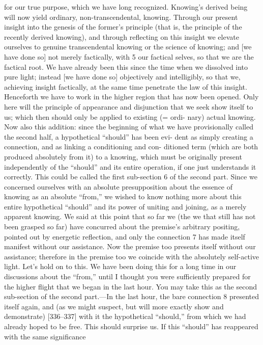 for our true purpose, which we have long recognized. Knowing’s derived being
will now yield ordinary, non-transcendental, knowing. Through our present
insight into the genesis of the former’s principle (that is, the principle of the
recently derived knowing), and through reflecting on this insight we elevate
ourselves to genuine transcendental knowing or the science of knowing; and
[we have done so] not merely factically, with 5 our factical selves, so that we are
the factical root. We have already been this since the time when we dissolved
into pure light; instead [we have done so] objectively and intelligibly, so that
we, achieving insight factically, at the same time penetrate the law of this
insight. Henceforth we have to work in the higher region that has now been
opened. Only here will the principle of appearance and disjunction that we
seek show itself to us; which then should only be applied to existing (= ordi-
nary) actual knowing. Now also this addition: since the beginning of what we
have provisionally called the second half, a hypothetical “should” has been evi-
dent as simply creating a connection, and as linking a conditioning and con-
ditioned term (which are both produced absolutely from it) to a knowing,
which must be originally present independently of the “should” and its entire
operation, if one just understands it correctly. This could be called the first
sub-section 6 of the second part. Since we concerned ourselves with an absolute
presupposition about the essence of knowing as an absolute “from,” we wished
to know nothing more about this entire hypothetical “should” and its power
of uniting and joining, as a merely apparent knowing. We said at this point
that so far we (the we that still has not been grasped so far) have concurred
about the premise’s arbitrary positing, pointed out by energetic reflection, and
only the connection 7 has made itself manifest without our assistance. Now the
premise too presents itself without our assistance; therefore in the premise too
we coincide with the absolutely self-active light. Let’s hold on to this. We have
been doing this for a long time in our discussions about the “from,” until I
thought you were sufficiently prepared for the higher flight that we began in
the last hour. You may take this as the second sub-section of the second
part.—In the last hour, the bare connection 8 presented itself again, and (as we
might suspect, but will more exactly show and demonstrate) [336–337] with
it the hypothetical “should,” from which we had already hoped to be free. This
should surprise us. If this “should” has reappeared with the same significance
